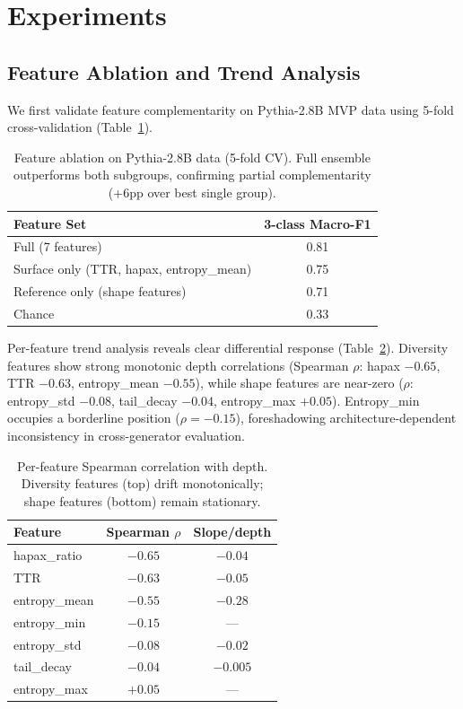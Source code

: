 \documentclass[11pt,a4paper]{article}
\begin{document}
\section{Experiments}

\subsection{Feature Ablation and Trend Analysis}
\label{sec:ablation}

We first validate feature complementarity on Pythia-2.8B MVP data using 5-fold cross-validation (Table~\ref{tab:ablation}).

\begin{table}[h]
\centering
\begin{tabular}{lc}
\toprule
\textbf{Feature Set} & \textbf{3-class Macro-F1} \\
\midrule
Full (7 features) & 0.81 \\
Surface only (TTR, hapax, entropy\_mean) & 0.75 \\
Reference only (shape features) & 0.71 \\
Chance & 0.33 \\
\bottomrule
\end{tabular}
\caption{Feature ablation on Pythia-2.8B data (5-fold CV). Full ensemble outperforms both subgroups, confirming partial complementarity (+6pp over best single group).}
\label{tab:ablation}
\end{table}

Per-feature trend analysis reveals clear differential response (Table~\ref{tab:trends}).
Diversity features show strong monotonic depth correlations (Spearman $\rho$: hapax $-0.65$, TTR $-0.63$, entropy\_mean $-0.55$), while shape features are near-zero ($\rho$: entropy\_std $-0.08$, tail\_decay $-0.04$, entropy\_max $+0.05$).
Entropy\_min occupies a borderline position ($\rho = -0.15$), foreshadowing architecture-dependent inconsistency in cross-generator evaluation.

\begin{table}[h]
\centering
\begin{tabular}{lcc}
\toprule
\textbf{Feature} & \textbf{Spearman $\rho$} & \textbf{Slope/depth} \\
\midrule
hapax\_ratio & $-0.65$ & $-0.04$ \\
TTR & $-0.63$ & $-0.05$ \\
entropy\_mean & $-0.55$ & $-0.28$ \\
entropy\_min & $-0.15$ & --- \\
entropy\_std & $-0.08$ & $-0.02$ \\
tail\_decay & $-0.04$ & $-0.005$ \\
entropy\_max & $+0.05$ & --- \\
\bottomrule
\end{tabular}
\caption{Per-feature Spearman correlation with depth. Diversity features (top) drift monotonically; shape features (bottom) remain stationary.}
\label{tab:trends}
\end{table}
\end{document}
